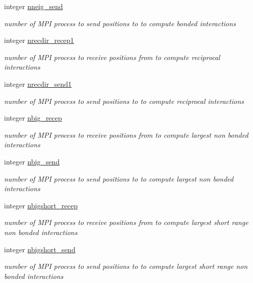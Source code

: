 \begin{DoxyCompactItemize}
integer \hyperlink{classdomdec_afa246e161fb21768b484c151b3866631}{nneig\-\_\-send}
\begin{DoxyCompactList}\small\item\em number of M\-P\-I process to send positions to to compute bonded interactions \end{DoxyCompactList}\item 
integer \hyperlink{classdomdec_a542f5d5bbc9198e5190417cf45390b81}{nrecdir\-\_\-recep1}
\begin{DoxyCompactList}\small\item\em number of M\-P\-I process to receive positions from to compute reciprocal interactions \end{DoxyCompactList}\item 
integer \hyperlink{classdomdec_a4dffa155fb7b24a0e90c0c94e7d4fdeb}{nrecdir\-\_\-send1}
\begin{DoxyCompactList}\small\item\em number of M\-P\-I process to send positions to to compute reciprocal interactions \end{DoxyCompactList}\item 
integer \hyperlink{classdomdec_ab07069ab2af1699dc506c4cd10c24a83}{nbig\-\_\-recep}
\begin{DoxyCompactList}\small\item\em number of M\-P\-I process to receive positions from to compute largest non bonded interactions \end{DoxyCompactList}\item 
integer \hyperlink{classdomdec_a259cec691f627989c92b56e625e5dc79}{nbig\-\_\-send}
\begin{DoxyCompactList}\small\item\em number of M\-P\-I process to send positions to to compute largest non bonded interactions \end{DoxyCompactList}\item 
integer \hyperlink{classdomdec_ad95084fcf28a5965b0e5ad423ee0697f}{nbigshort\-\_\-recep}
\begin{DoxyCompactList}\small\item\em number of M\-P\-I process to receive positions from to compute largest short range non bonded interactions \end{DoxyCompactList}\item 
integer \hyperlink{classdomdec_a7b930faf1e5cfbfc5f71442a81f49dbb}{nbigshort\-\_\-send}
\begin{DoxyCompactList}\small\item\em number of M\-P\-I process to send positions to to compute largest short range non bonded interactions \end{DoxyCompactList}\item 

\end{DoxyCompactItemize}
